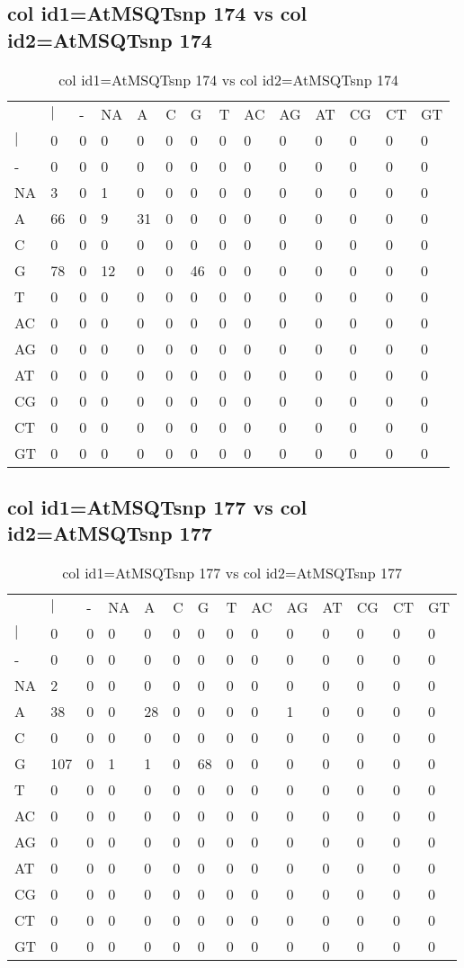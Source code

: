 \subsection{col id1=AtMSQTsnp 174 vs col id2=AtMSQTsnp 174}
\begin{center}
\begin{longtable}{|l|l|l|l|l|l|l|l|l|l|l|l|l|l|}
\caption{col id1=AtMSQTsnp 174 vs col id2=AtMSQTsnp 174} \label{table_dm554}\\
\hline
\\
\hline
&$|$&-&NA&A&C&G&T&AC&AG&AT&CG&CT&GT\\
$|$&0&0&0&0&0&0&0&0&0&0&0&0&0\\
-&0&0&0&0&0&0&0&0&0&0&0&0&0\\
NA&3&0&1&0&0&0&0&0&0&0&0&0&0\\
A&66&0&9&31&0&0&0&0&0&0&0&0&0\\
C&0&0&0&0&0&0&0&0&0&0&0&0&0\\
G&78&0&12&0&0&46&0&0&0&0&0&0&0\\
T&0&0&0&0&0&0&0&0&0&0&0&0&0\\
AC&0&0&0&0&0&0&0&0&0&0&0&0&0\\
AG&0&0&0&0&0&0&0&0&0&0&0&0&0\\
AT&0&0&0&0&0&0&0&0&0&0&0&0&0\\
CG&0&0&0&0&0&0&0&0&0&0&0&0&0\\
CT&0&0&0&0&0&0&0&0&0&0&0&0&0\\
GT&0&0&0&0&0&0&0&0&0&0&0&0&0\\
\hline
\end{longtable}
\end{center}

\subsection{col id1=AtMSQTsnp 177 vs col id2=AtMSQTsnp 177}
\begin{center}
\begin{longtable}{|l|l|l|l|l|l|l|l|l|l|l|l|l|l|}
\caption{col id1=AtMSQTsnp 177 vs col id2=AtMSQTsnp 177} \label{table_dm556}\\
\hline
\\
\hline
&$|$&-&NA&A&C&G&T&AC&AG&AT&CG&CT&GT\\
$|$&0&0&0&0&0&0&0&0&0&0&0&0&0\\
-&0&0&0&0&0&0&0&0&0&0&0&0&0\\
NA&2&0&0&0&0&0&0&0&0&0&0&0&0\\
A&38&0&0&28&0&0&0&0&1&0&0&0&0\\
C&0&0&0&0&0&0&0&0&0&0&0&0&0\\
G&107&0&1&1&0&68&0&0&0&0&0&0&0\\
T&0&0&0&0&0&0&0&0&0&0&0&0&0\\
AC&0&0&0&0&0&0&0&0&0&0&0&0&0\\
AG&0&0&0&0&0&0&0&0&0&0&0&0&0\\
AT&0&0&0&0&0&0&0&0&0&0&0&0&0\\
CG&0&0&0&0&0&0&0&0&0&0&0&0&0\\
CT&0&0&0&0&0&0&0&0&0&0&0&0&0\\
GT&0&0&0&0&0&0&0&0&0&0&0&0&0\\
\hline
\end{longtable}
\end{center}

